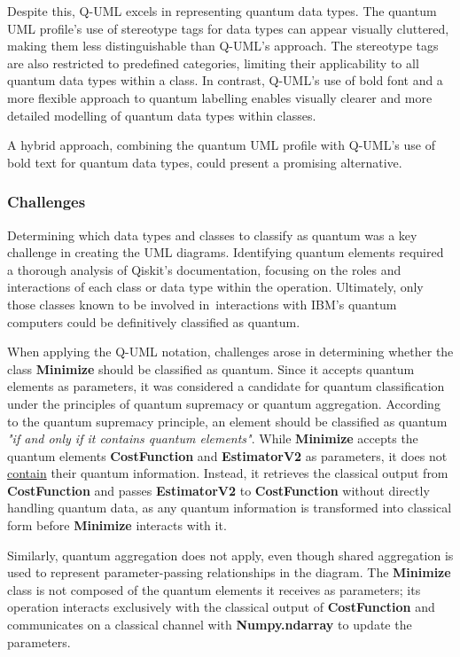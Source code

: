 \documentclass{article}
\begin{document}
Despite this, Q-UML excels in representing quantum data types. The quantum UML profile’s use of stereotype tags for data types can appear visually cluttered, making them less distinguishable than Q-UML’s approach. The stereotype tags are also restricted to predefined categories, limiting their applicability to all quantum data types within a class. In contrast, Q-UML's use of bold font and a more flexible approach to quantum labelling enables visually clearer and more detailed modelling of quantum data types within classes.

A hybrid approach, combining the quantum UML profile with Q-UML's use of bold text for quantum data types, could present a promising alternative.

\subsubsection{Challenges}

Determining which data types and classes to classify as quantum was a key challenge in creating the UML diagrams. Identifying quantum elements required a thorough analysis of Qiskit’s documentation, focusing on the roles and interactions of each class or data type within the operation. Ultimately, only those classes known to be involved in interactions with IBM's quantum computers could be definitively classified as quantum. 

When applying the Q-UML notation, challenges arose in determining whether the class \textbf{Minimize} should be classified as quantum. Since it accepts quantum elements as parameters, it was considered a candidate for quantum classification under the principles of quantum supremacy or quantum aggregation. According to the quantum supremacy principle, an element should be classified as quantum \textit{"if and only if it contains quantum elements"}\cite{Pérez-Castillo2022}. While \textbf{Minimize} accepts the quantum elements \textbf{CostFunction} and \textbf{EstimatorV2} as parameters, it does not \underline{contain} their quantum information. Instead, it retrieves the classical output from \textbf{CostFunction} and passes \textbf{EstimatorV2} to \textbf{CostFunction} without directly handling quantum data, as any quantum information is transformed into classical form before \textbf{Minimize} interacts with it.

Similarly, quantum aggregation does not apply, even though shared aggregation is used to represent parameter-passing relationships in the diagram. The \textbf{Minimize} class is not composed of the quantum elements it receives as parameters; its operation interacts exclusively with the classical output of \textbf{CostFunction} and communicates on a classical channel with \textbf{Numpy.ndarray} to update the parameters.
\end{document}
